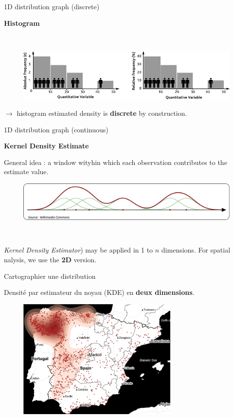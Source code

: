 \begin{frame}{1D distribution graph (discrete)}

\textbf{Histogram}

~ 

\begin{figure}
\includegraphics[width=12cm]{Histogramme_EN.pdf}
\end{figure}

$\rightarrow$ histogram estimated density is \textbf{discrete} by construction.

\end{frame}


\begin{frame}{1D distribution graph (continuous)}

\textbf{Kernel Density Estimate}

General idea : a window wityhin which each observation contributes to the estimate value.

\begin{figure}
\includegraphics[width=12cm]{KDE.pdf}
\end{figure}

~

\textit{Kernel Density Estimator}) may be applied in 1 to $n$ dimensions. 
For spatial nalysis, we use the \textbf{2D} version.

\end{frame}


\begin{frame}{Cartographier une distribution}

Densité par estimateur du noyau (KDE) en \textbf{deux dimensions}.

\begin{figure}
  \includegraphics[width=8cm]{Incendies.jpg}
\end{figure}

\end{frame}


